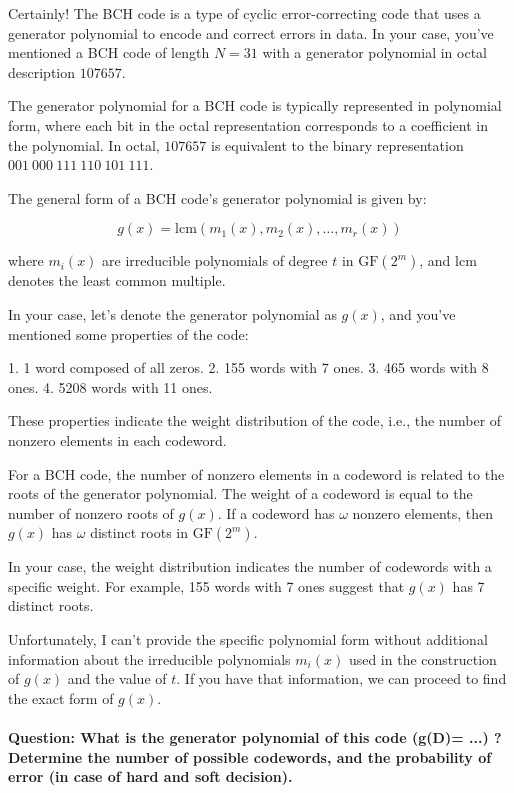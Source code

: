 \documentclass[colorlinks,11pt,a4paper,normalphoto,withhyper,ragged2e]{altareport}
\begin{document}
				
				Certainly! The BCH code is a type of cyclic error-correcting code that uses a generator polynomial to encode and correct errors in data. In your case, you've mentioned a BCH code of length \(N = 31\) with a generator polynomial in octal description \(107657\).
				
				The generator polynomial for a BCH code is typically represented in polynomial form, where each bit in the octal representation corresponds to a coefficient in the polynomial. In octal, \(107657\) is equivalent to the binary representation \(001\ 000\ 111\ 110\ 101\ 111\).
				
				The general form of a BCH code's generator polynomial is given by:
				
				\[ g(x) = \text{{lcm}}\left( m_1(x), m_2(x), \ldots, m_r(x) \right) \]
				
				where \( m_i(x) \) are irreducible polynomials of degree \( t \) in \(\text{{GF}}(2^m)\), and \( \text{{lcm}} \) denotes the least common multiple.
				
				In your case, let's denote the generator polynomial as \( g(x) \), and you've mentioned some properties of the code:
				
				1. 1 word composed of all zeros.
				2. 155 words with 7 ones.
				3. 465 words with 8 ones.
				4. 5208 words with 11 ones.
				
				These properties indicate the weight distribution of the code, i.e., the number of nonzero elements in each codeword.
				
				For a BCH code, the number of nonzero elements in a codeword is related to the roots of the generator polynomial. The weight of a codeword is equal to the number of nonzero roots of \( g(x) \). If a codeword has \( \omega \) nonzero elements, then \( g(x) \) has \( \omega \) distinct roots in \(\text{{GF}}(2^m)\).
				
				In your case, the weight distribution indicates the number of codewords with a specific weight. For example, 155 words with 7 ones suggest that \( g(x) \) has 7 distinct roots.
				
				Unfortunately, I can't provide the specific polynomial form without additional information about the irreducible polynomials \( m_i(x) \) used in the construction of \( g(x) \) and the value of \( t \). If you have that information, we can proceed to find the exact form of \( g(x) \).
				
				
				
				\paragraph{Question: What is the generator polynomial of this code (g(D)= ...) ? Determine the number of possible codewords, and the probability of error (in case of hard and soft decision).}
\end{document}
